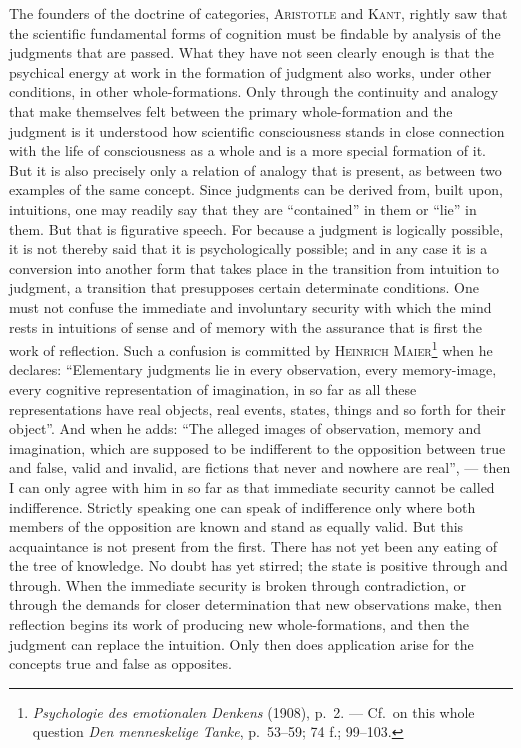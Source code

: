 \documentclass[12pt]{book}
\newcommand{\opage}[1]{\marginnote{\footnotesize\textit{[#1]}}}
\begin{document}
The founders of the doctrine of categories, \textsc{Aristotle} and
\textsc{Kant}, rightly saw that the scientific fundamental forms of cognition
must be findable by analysis of the judgments that are passed. What they have
not seen clearly enough is that the psychical energy at work in the formation of
judgment also works, under other conditions, in other \opage{8}whole-formations. Only
through the continuity and analogy that make themselves felt between the primary
whole-formation and the judgment is it understood how scientific consciousness
stands in close connection with the life of consciousness as a whole and is a
more special formation of it. But it is also precisely only a relation of
analogy that is present, as between two examples of the same concept. Since
judgments can be derived from, built upon, intuitions, one may readily say that
they are ``contained'' in them or ``lie'' in them. But that is figurative
speech. For because a judgment is logically possible, it is not thereby said
that it is psychologically possible; and in any case it is a conversion into
another form that takes place in the transition from intuition to judgment, a
transition that presupposes certain determinate conditions. One must not confuse
the immediate and involuntary security with which the mind rests in intuitions
of sense and of memory with the assurance that is first the work of reflection.
Such a confusion is committed by \textsc{Heinrich
Maier}\footnote{\textit{Psychologie des emotionalen Denkens} (1908), p.\ 2. ---
Cf.\ on this whole question \textit{Den menneskelige Tanke}, p.\ 53--59; 74 f.;
99--103.} when he declares: ``Elementary judgments lie in every observation,
every memory-image, every cognitive representation of imagination, in so far as
all these representations have real objects, real events, states, things and so
forth for their object''. And when he adds: ``The alleged images of observation,
memory and imagination, which are supposed to be indifferent to the opposition
between true and false, valid and invalid, are fictions that never and nowhere
are real'', --- then I can only agree with him in so far as that immediate
security cannot be called indifference. Strictly speaking one can speak of
indifference only where both members of the opposition are known and stand as
equally valid. But this acquaintance is not present from the first. There has
not yet been any eating of the tree of knowledge. No doubt has yet stirred; the
state is positive through and through. When the immediate security is broken
through contradiction, or through the demands for closer determination that new
observations make, then reflection begins its work of producing new
whole-formations, and then the judgment can replace the intuition. Only then
does application arise for the concepts true and false as opposites.
\end{document}
